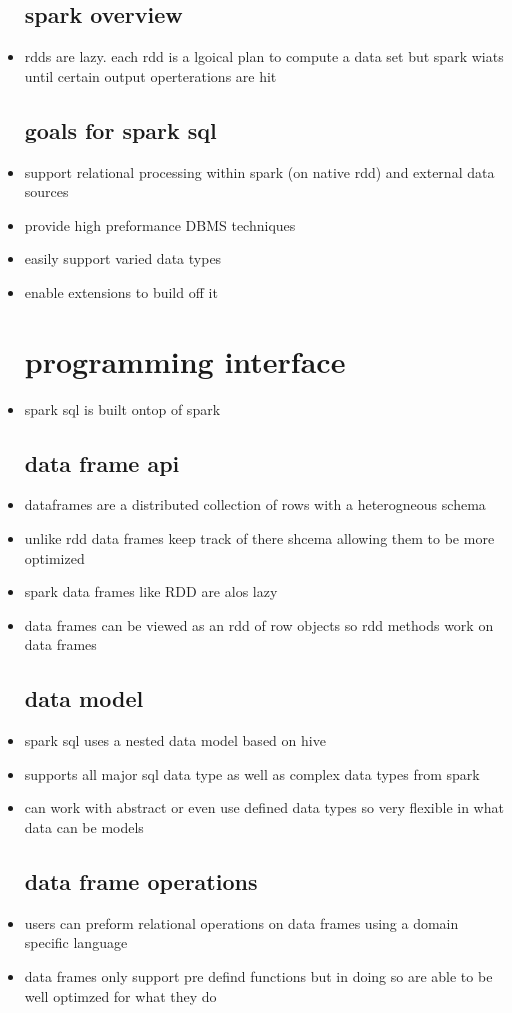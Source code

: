 \documentclass{article}
\begin{document}
\begin{itemize}
\subsection*{spark overview}
\item rdds are lazy. each rdd is a lgoical plan to compute a data set but spark wiats until certain output operterations are hit 
\subsection*{goals for spark sql}
\item support relational processing within spark (on native rdd) and external data sources
\item provide high preformance DBMS techniques
\item easily support varied data types 
\item enable extensions to build off it 

\section*{programming interface}
\item spark sql is built ontop of spark
\subsection*{data frame api}
\item dataframes are a distributed collection of rows with a heterogneous schema 
\item unlike rdd data frames keep track of there shcema allowing them to be more optimized
\item spark data frames like RDD are alos lazy
\item data frames can be viewed as an rdd of row objects so rdd methods work on data frames 
\subsection*{data model}
\item spark sql uses a nested data model based on hive 
\item supports all major sql data type as well as complex data types from spark
\item can work with abstract or even use defined data types so very flexible in what data can be models 
\subsection*{data frame operations}
\item users can preform relational operations on data frames using a domain specific language
\item data frames only support pre defind functions but in doing so are able to be well optimzed for what they do

\end{itemize}
\end{document}
